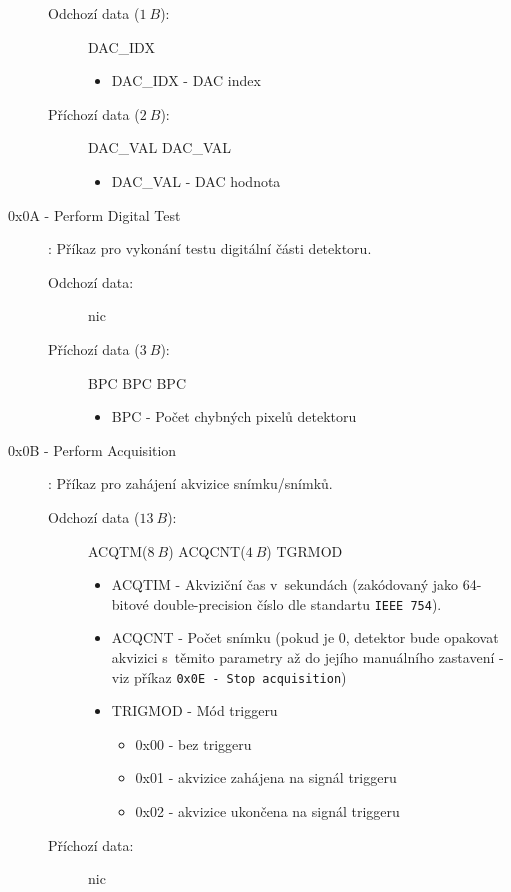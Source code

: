 \begin{description}
\begin{description}
			\item[Odchozí data ($1~B$):] DAC\_IDX
				\begin{itemize}
					\item DAC\_IDX - DAC index
				\end{itemize}
			\item[Příchozí data ($2~B$):] DAC\_VAL DAC\_VAL
				\begin{itemize}
					\item DAC\_VAL - DAC hodnota
				\end{itemize}
		\end{description}
	\item[0x0A - Perform Digital Test]:
		Příkaz pro vykonání testu digitální části detektoru.
		\begin{description}
			\item[Odchozí data:] nic
			\item[Příchozí data ($3~B$):] BPC BPC BPC
				\begin{itemize}
					\item BPC - Počet chybných pixelů detektoru
				\end{itemize}
		\end{description}
	\item[0x0B - Perform Acquisition]:
		Příkaz pro zahájení akvizice snímku/snímků.
		\begin{description}
			\item[Odchozí data ($13~B$):] ACQTM($8~B$) ACQCNT($4~B$) TGRMOD
				\begin{itemize}
					\item ACQTIM - Akviziční čas v~sekundách (zakódovaný jako 64-bitové double-precision číslo dle standartu \texttt{IEEE 754}).
					\item ACQCNT - Počet snímku (pokud je 0, detektor bude opakovat akvizici s~těmito parametry až do jejího manuálního zastavení - viz příkaz \texttt{0x0E - Stop acquisition})
					\item TRIGMOD - Mód triggeru
						\begin{itemize}
							\item 0x00 - bez triggeru
							\item 0x01 - akvizice zahájena na signál triggeru
							\item 0x02 - akvizice ukončena
							 na signál triggeru
						\end{itemize}
				\end{itemize}
			\item[Příchozí data:] nic
		\end{description}

\end{description}
